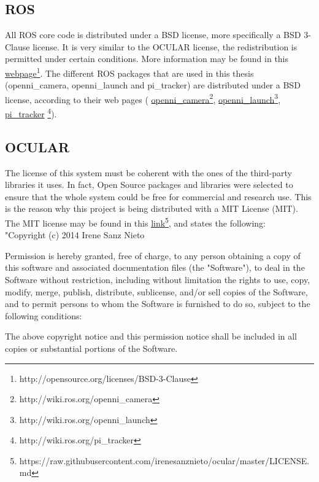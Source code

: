 	\subsection{ROS}
	All ROS core code is distributed under a BSD license, more specifically a BSD 3-Clause license. 
	It is very similar to the OCULAR license, the redistribution is permitted under certain conditions. 
	More information may be found in this \href{http://opensource.org/licenses/BSD-3-Clause}{\color{blue} {webpage}}\footnote{http://opensource.org/licenses/BSD-3-Clause}. 
	The different ROS packages that are used in this thesis (openni\_camera, openni\_launch and pi\_tracker) are distributed under a BSD license, according to their web pages ( \href{http://wiki.ros.org/openni_camera}{openni\_camera}\footnote{http://wiki.ros.org/openni_camera}, \href{http://wiki.ros.org/openni_launch}{openni\_launch}\footnote{http://wiki.ros.org/openni_launch}, \href{http://wiki.ros.org/pi_tracker}{pi\_tracker} \footnote{http://wiki.ros.org/pi\_tracker}).


	\subsection{OCULAR}
	\label{ocular}
	The license of this system must be coherent with the ones of the third-party libraries it uses.
	In fact, Open Source packages and libraries were selected to ensure that the whole system could be free for commercial and research use. 
	This is the reason why this project is being distributed with a MIT License (MIT). 
	The MIT license may be found in this  \href{https://raw.githubusercontent.com/irenesanznieto/ocular/master/LICENSE.md}{\color{blue}\underline {link}}\footnote{https://raw.githubusercontent.com/irenesanznieto/ocular/master/LICENSE.md}, and states the following: \\

	"Copyright (c) 2014 Irene Sanz Nieto

Permission is hereby granted, free of charge, to any person obtaining a copy of this software and associated documentation files (the "Software"), to deal in the Software without restriction, including without limitation the rights to use, copy, modify, merge, publish, distribute, sublicense, and/or sell copies of the Software, and to permit persons to whom the Software is furnished to do so, subject to the following conditions:

The above copyright notice and this permission notice shall be included in all copies or substantial portions of the Software.

